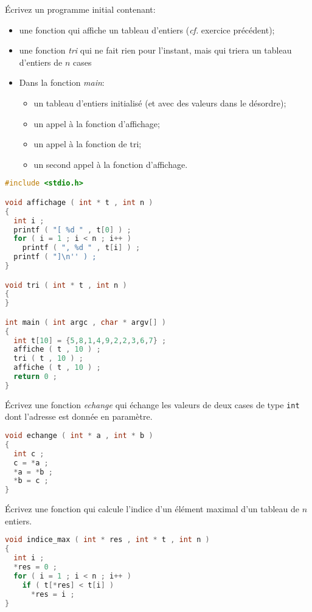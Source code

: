 \question Écrivez un programme initial contenant:
\begin{itemize}
\item une fonction qui affiche un tableau d'entiers (\textit{cf.} exercice précédent);
\item une fonction \emph{tri} qui ne fait rien pour l'instant, mais qui triera un tableau d'entiers de \(n\) cases
\item Dans la fonction \emph{main}:
  \begin{itemize}
  \item un tableau d'entiers initialisé (et avec des valeurs dans le
    désordre);
  \item un appel à la fonction d'affichage;
  \item un appel à la fonction de tri;
  \item un second appel à la fonction d'affichage.
  \end{itemize}
\end{itemize}

\begin{solutioncachee}
  \begin{lstlisting}[language=C]
#include <stdio.h>

void affichage ( int * t , int n )
{
  int i ;
  printf ( "[ %d " , t[0] ) ;
  for ( i = 1 ; i < n ; i++ )
    printf ( ", %d " , t[i] ) ;
  printf ( "]\n'' ) ;
}

void tri ( int * t , int n )
{
}

int main ( int argc , char * argv[] )
{
  int t[10] = {5,8,1,4,9,2,2,3,6,7} ;
  affiche ( t , 10 ) ;
  tri ( t , 10 ) ;
  affiche ( t , 10 ) ;
  return 0 ;
}
  \end{lstlisting}
\end{solutioncachee}

\question Écrivez une fonction \emph{echange} qui échange les valeurs
de deux cases de type \texttt{int} dont l'adresse est donnée en paramètre.

\begin{solutioncachee}
  \begin{lstlisting}[language=C]
void echange ( int * a , int * b )
{
  int c ;
  c = *a ;
  *a = *b ;
  *b = c ;
}
  \end{lstlisting}
\end{solutioncachee}

\question Écrivez une fonction qui calcule l'indice d'un élément
maximal d'un tableau de \(n\) entiers.

\begin{solutioncachee}
  \begin{lstlisting}[language=C]
void indice_max ( int * res , int * t , int n )
{
  int i ;
  *res = 0 ;
  for ( i = 1 ; i < n ; i++ )
    if ( t[*res] < t[i] )
      *res = i ;
}
  \end{lstlisting}
\end{solutioncachee}

